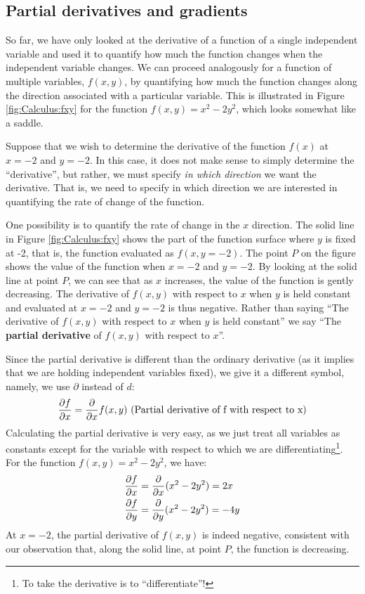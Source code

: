 \subsection{Partial derivatives and gradients}
So far, we have only looked at the derivative of a function of a single independent variable and used it to quantify how much the function changes when the independent variable changes. We can proceed analogously for a function of multiple variables, $f(x,y)$, by quantifying how much the function changes along the direction associated with a particular variable. This is illustrated in Figure \ref{fig:Calculus:fxy} for the function $f(x,y)=x^2-2y^2$, which looks somewhat like a saddle. 


Suppose that we wish to determine the derivative of the function $f(x)$ at $x=-2$ and $y=-2$. In this case, it does not make sense to simply determine the ``derivative'', but rather, we must specify \textit{in which direction} we want the derivative. That is, we need to specify in which direction we are interested in quantifying the rate of change of the function.

One possibility is to quantify the rate of change in the $x$ direction. The solid line in Figure \ref{fig:Calculus:fxy} shows the part of the function surface where $y$ is fixed at -2, that is, the function evaluated as $f(x,y=-2)$. The point $P$ on the figure shows the value of the function when $x=-2$ and $y=-2$. By looking at the solid line at point $P$, we can see that as $x$ increases, the value of the function is gently decreasing. The derivative of $f(x,y)$ with respect to $x$ when $y$ is held constant and evaluated at $x=-2$ and $y=-2$ is thus negative. Rather than saying ``The derivative of $f(x,y)$ with respect to $x$ when $y$ is held constant'' we say ``The \textbf{partial derivative} of $f(x,y)$ with respect to $x$''.

 Since the partial derivative is different than the ordinary derivative (as it implies that we are holding independent variables fixed), we give it a different symbol, namely, we use $\partial$ instead of $d$:
\begin{align*}
\frac{\partial f}{\partial x}=\frac{\partial }{\partial x}f(x,y)\text{ (Partial derivative of f with respect to x)}
\end{align*}
Calculating the partial derivative is very easy, as we just treat all variables as constants except for the variable with respect to which we are differentiating\footnote{To take the derivative is to ``differentiate''!}. For the function $f(x,y)=x^2-2y^2$, we have:
\begin{align*}
\frac{\partial f}{\partial x}&=\frac{\partial }{\partial x}(x^2-2y^2) = 2x\\
\frac{\partial f}{\partial y}&=\frac{\partial }{\partial y}(x^2-2y^2) = -4y
\end{align*}
At $x=-2$, the partial derivative of $f(x,y)$ is indeed negative, consistent with our observation that, along the solid line, at point $P$, the function is decreasing.

